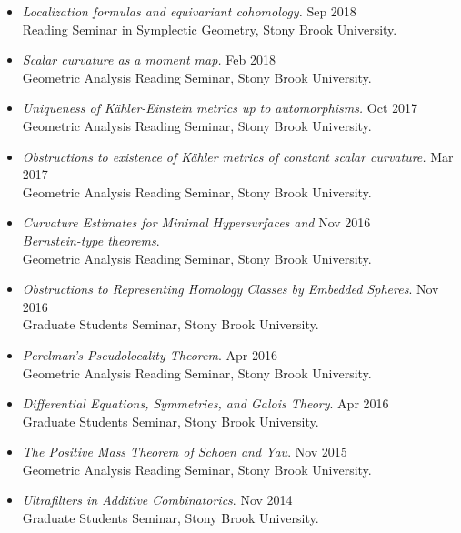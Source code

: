 \documentclass[10pt]{article}
\newenvironment{outerlist}[1][\enskip\textbullet]%
        {\begin{itemize}[#1,leftmargin=*]}{\end{itemize}%
         \vspace{-.6\baselineskip}}
\begin{document}
\begin{outerlist}
\item[] \textit{Localization formulas and equivariant cohomology.} \hfill Sep 2018\\
Reading Seminar in Symplectic Geometry, Stony Brook University. 

\item[] \textit{Scalar curvature as a moment map.} \hfill Feb 2018\\
Geometric Analysis Reading Seminar, Stony Brook University. 

\item[] \textit{Uniqueness of K\"ahler-Einstein metrics up to automorphisms.} \hfill Oct 2017\\
Geometric Analysis Reading Seminar, Stony Brook University.

\item[] \textit{Obstructions to existence of K\"ahler metrics of constant scalar curvature.} \hfill Mar 2017\\
Geometric Analysis Reading Seminar, Stony Brook University.

\item[] \textit{Curvature Estimates for Minimal Hypersurfaces and} \hfill Nov 2016\\
\textit{Bernstein-type theorems}. \\
Geometric Analysis Reading Seminar, Stony Brook University.


\item[] \textit{Obstructions to Representing Homology Classes by Embedded Spheres}. \hfill Nov 2016\\
Graduate Students Seminar, Stony Brook University.

\item[] \textit{Perelman's Pseudolocality Theorem}. \hfill Apr 2016\\
Geometric Analysis Reading Seminar, Stony Brook University.

\item[] \textit{Differential Equations, Symmetries, and Galois Theory}. \hfill Apr 2016\\
Graduate Students Seminar, Stony Brook University.

\item[] \textit{The Positive Mass Theorem of Schoen and Yau}. \hfill Nov 2015\\
Geometric Analysis Reading Seminar, Stony Brook University.

\item[] \textit{Ultrafilters in Additive Combinatorics}. \hfill Nov 2014\\
Graduate Students Seminar, Stony Brook University.


\end{outerlist}
\end{document}
